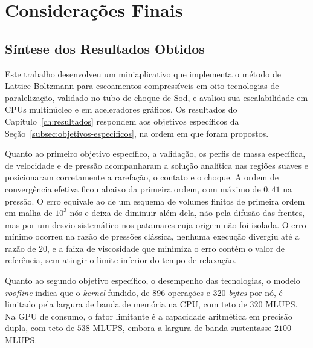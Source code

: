
\chapter[Considerações Finais]{Considerações Finais}\label{ch:consideracoes-finais}






\section{Síntese dos Resultados Obtidos}\label{sec:sintese-dos-resultados-obtidos}

Este trabalho desenvolveu um miniaplicativo que implementa o método de Lattice Boltzmann para escoamentos compressíveis em oito tecnologias de paralelização, validado no tubo de choque de Sod, e avaliou sua escalabilidade em CPUs multinúcleo e em aceleradores gráficos.
Os resultados do Capítulo~\ref{ch:resultados} respondem aos objetivos específicos da Seção~\ref{subsec:objetivos-especificos}, na ordem em que foram propostos.

Quanto ao primeiro objetivo específico, a validação, os perfis de massa específica, de velocidade e de pressão acompanharam a solução analítica nas regiões suaves e posicionaram corretamente a rarefação, o contato e o choque.
A ordem de convergência efetiva ficou abaixo da primeira ordem, com máximo de \(0{,}41\) na pressão.
O erro equivale ao de um esquema de volumes finitos de primeira ordem em malha de \(10^3\) nós e deixa de diminuir além dela, não pela difusão das frentes, mas por um desvio sistemático nos patamares cuja origem não foi isolada.
O erro mínimo ocorreu na razão de pressões clássica, nenhuma execução divergiu até a razão de \(20\), e a faixa de viscosidade que minimiza o erro contém o valor de referência, sem atingir o limite inferior do tempo de relaxação.

Quanto ao segundo objetivo específico, o desempenho das tecnologias, o modelo \textit{roofline} indica que o \textit{kernel} fundido, de \(896\) operações e \(320\) \textit{bytes} por nó, é limitado pela largura de banda de memória na CPU, com teto de \(320\) MLUPS.
Na GPU de consumo, o fator limitante é a capacidade aritmética em precisão dupla, com teto de \(538\) MLUPS, embora a largura de banda sustentasse \(2100\) MLUPS.

